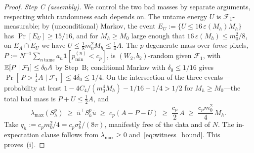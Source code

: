 \begin{proof}
\emph{Step C (assembly).} We control the two bad masses by separate
arguments, respecting which randomness each depends on. The untame energy
$U$ is $\mathcal{F}_1$-measurable; by (unconditional) Markov, the event
$E_U := \{ U \leq 16\, \varepsilon(M_h) M_h \}$ has $\Pr[E_U] \geq 15/16$,
and for $M_h \geq M_0$ large enough that
$16\, \varepsilon(M_h) \leq m_0^2/8$, on $E_A \cap E_U$ we have
$U \leq \tfrac{1}{8} m_0^2 M_h \leq \tfrac{1}{4} A$. The $p$-degenerate mass
over \emph{tame} pixels,
$P := N^{-1} \sum_{n\ \mathrm{tame}} a_n
\mathbf{1}[p^{(n)}_{\min} < c_p]$, is $(W_2, b_2)$-random given
$\mathcal{F}_1$, with $\mathbb{E}[P \mid \mathcal{F}_1] \leq \delta_0 A$ by Step~B;
conditional Markov with $\delta_0 \leq 1/16$ gives
$\Pr[\, P > \tfrac{1}{4} A \mid \mathcal{F}_1 \,] \leq 4\delta_0 \leq 1/4$.
On the intersection of the three events---probability at least
$1 - 4 C_4/(m_0^4 M_h) - 1/16 - 1/4 > 1/2$ for $M_h \geq M_0$---the total
bad mass is $P + U \leq \tfrac{1}{2} A$, and
\[
    \lambda_{\max}(S_h^{p})
    \;\geq\; \bar{u}^\top S_h^{p} \bar{u}
    \;\geq\; c_p \left( A - P - U \right)
    \;\geq\; \frac{c_p}{2}\, A
    \;\geq\; \frac{c_p m_0^2}{4}\, M_h .
\]
Take $q_h := c_p m_0^2 / 4 = c_p \sigma_b^2 / (8\pi)$, manifestly free of
the data and of $N$. The in-expectation clause follows from
$\lambda_{\max} \geq 0$ and~\eqref{eq:witness_bound}. This proves~(i).


\end{proof}
